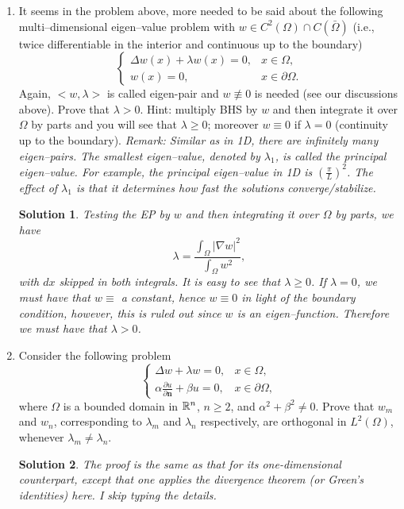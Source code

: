 \documentclass[6pt]{article}
\newtheorem{solution}{Solution}
\numberwithin{equation}{section}
\def\mathbb{\Bbb}
\begin{document}
\begin{enumerate}
\item It seems in the problem above, more needed to be said about the following multi--dimensional eigen--value problem with $w\in C^2(\Omega)\cap C(\bar\Omega)$ (i.e., twice differentiable in the interior and continuous up to the boundary)
\begin{equation}\label{DEP}
\left\{
\begin{array}{ll}
\Delta w(x)+\lambda w(x)=0,& x\in\Omega,\\
w(x)=0, &x\in\partial \Omega.
\end{array}
\right.
\end{equation}
Again, $<w,\lambda>$ is called eigen-pair and $w\not\equiv0$ is needed (see our discussions above).  Prove that $\lambda>0$.  Hint: multiply BHS by $w$ and then integrate it over $\Omega$ by parts and you will see that $\lambda\geq0$; moreover $w\equiv 0$ if $\lambda=0$ (continuity up to the boundary).  \emph{Remark: Similar as in 1D, there are infinitely many eigen--pairs.  The smallest eigen--value, denoted by $\lambda_1$, is called the principal eigen--value.  For example, the principal eigen--value in 1D is $(\frac{\pi}{L})^2$.  The effect of $\lambda_1$ is that it determines how fast the solutions converge/stabilize.}
\begin{solution}
Testing the EP by $w$ and then integrating it over $\Omega$ by parts, we have
\[\lambda=\frac{\int_\Omega |\nabla w|^2}{\int_\Omega w^2},\]
with $dx$ skipped in both integrals.  It is easy to see that $\lambda \geq0$.  If $\lambda=0$, we must have that $w\equiv$ a constant, hence $w\equiv 0$ in light of the boundary condition, however, this is ruled out since $w$ is an eigen--function.  Therefore we must have that $\lambda>0$.
\end{solution}

\item Consider the following problem
\begin{equation}\label{ndep}
\left\{
\begin{array}{ll}
\Delta w+\lambda w=0,& x\in \Omega,\\
\alpha\frac{\partial u}{\partial \textbf{n}}+\beta u=0, &x\in\partial\Omega,
\end{array}
\right.
\end{equation}
where $\Omega$ is a bounded domain in $\mathbb R^n$, $n\geq2$, and $\alpha^2+\beta^2\neq0$.  Prove that $w_m$ and $w_n$, corresponding to $\lambda_m$ and $\lambda_n$ respectively, are orthogonal in $L^2(\Omega)$, whenever $\lambda_m\neq \lambda_n$.
\begin{solution}
The proof is the same as that for its one-dimensional counterpart, except that one applies the divergence theorem (or Green's identities) here.  I skip typing the details.
\end{solution}



\end{enumerate}
\end{document}
